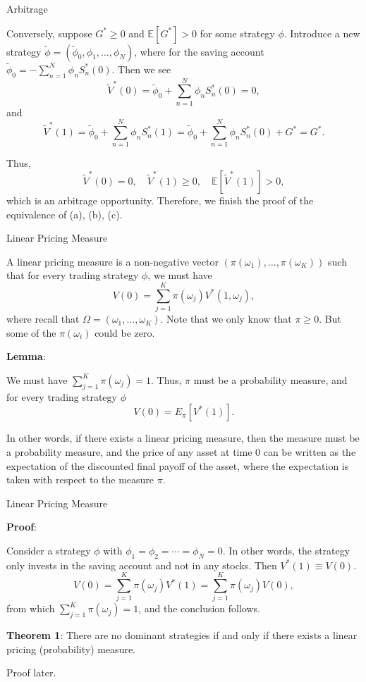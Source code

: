 \documentclass{beamer}
\begin{document}
\begin{frame}{Arbitrage}

    {\footnotesize \footnotesize
      Conversely, suppose $G^* \geq 0$ and $\mathbb{E}[G^*] > 0$ for some strategy $\phi$. Introduce a new strategy $\tilde{\phi} = (\tilde{\phi}_0, \phi_1, \ldots, \phi_N)$, where for the saving account $\tilde{\phi}_0 = -\sum_{n=1}^N \phi_n S_n^*(0)$. Then we see
\[
\tilde{V}^*(0) = \tilde{\phi}_0 + \sum_{n=1}^N \phi_n S_n^*(0) = 0,
\]
and
\[
\tilde{V}^*(1) = \tilde{\phi}_0 + \sum_{n=1}^{N} \phi_n S_n^*(1) = \tilde{\phi}_0 + \sum_{n=1}^{N} \phi_n S_n^*(0) + G^* = G^*.
\]

Thus,
\[
\tilde{V}^*(0) = 0, \quad \tilde{V}^*(1) \geq 0, \quad \mathbb{E}[\tilde{V}^*(1)] > 0,
\]
which is an arbitrage opportunity. Therefore, we finish the proof of the equivalence of (a), (b), (c).
    }
\end{frame}

\begin{frame}{Linear Pricing Measure}

    {\footnotesize \footnotesize
      A linear pricing measure is a non-negative vector $(\pi(\omega_1), \ldots, \pi(\omega_K))$ 
      such that for every trading strategy $\phi$, we must have
    \[
    V(0) = \sum_{j=1}^K \pi(\omega_j) V^*(1, \omega_j),
    \]
    where recall that $\Omega = (\omega_1, \ldots, \omega_K)$. 
    Note that we only know that $\pi \geq 0$. But some of the $\pi(\omega_i)$ could be zero.
    \par \textbf{Lemma}:
    \par We must have $\sum_{j=1}^K \pi(\omega_j) = 1$. Thus, $\pi$ must be a probability measure, and for every trading strategy $\phi$
\[
V(0) = E_\pi [V^*(1)].
\]

In other words, if there exists a linear pricing measure, 
then the measure must be a probability measure, and the price of any asset at time 0 can be written as the expectation of the discounted final 
payoff of the asset, where the expectation is taken with respect to the measure $\pi$.
    }
\end{frame}
\begin{frame}{Linear Pricing Measure}

    {\footnotesize \footnotesize
       \par \textbf{Proof}:
       \par Consider a strategy $\phi$ with $\phi_1 = \phi_2 = \cdots = \phi_N = 0$. In other words, the strategy only invests in the saving account and not in any stocks. Then $V^*(1) \equiv V(0)$.
\[
V(0) = \sum_{j=1}^K \pi(\omega_j) V^*(1) = \sum_{j=1}^K \pi(\omega_j) V(0),
\]
from which $\sum_{j=1}^K \pi(\omega_j) = 1$, and the conclusion follows.
\vspace{1em}

\par \textbf{Theorem 1}: There are no dominant strategies 
if and only if there exists a linear pricing (probability) measure.
\vspace{1em}
\par Proof later.
    }
\end{frame}
\end{document}
